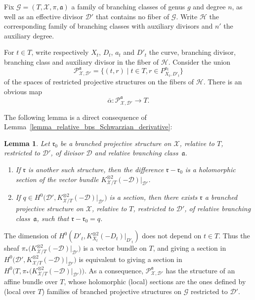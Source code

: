 \documentclass[10pt]{amsart}
\theoremstyle{definition}
\theoremstyle{plain}
\newtheorem{lemma}[definition]{Lemma}
\begin{document}
Fix $\mathcal G = (T, \mathcal X, \pi, \mathfrak a)$ a family of branching classes of genus $g$ and degree $n$, as well as an effective divisor $\mathcal D'$ that contains no fiber of $\mathcal G$.
Write $\mathcal H$ the corresponding family of branching classes with auxiliary divisors and $n'$ the auxiliary degree.

For $t \in T$, write respectively $X_t$, $D_t$, $a_t$ and $D'_t$ the curve, branching divisor, branching class and auxiliary divisor in the fiber of $\mathcal H$.
Consider the union\vspace*{-3pt}
\begin{equation*}
\mathcal P_{\mathcal X, \mathcal D'}^{\mathfrak a} = \bigl\{(t, r)\mid t \in T, r \in P_{X_t, D'_t}^{a_t}\bigr\}
\end{equation*}
of the spaces of restricted projective structures on the fibers of $\mathcal H$.
There is an obvious map\vspace*{-3pt}
\begin{equation*}
\overline \alpha: \mathcal P_{\mathcal X, \mathcal D'}^{\mathfrak a} \to T.
\end{equation*}

The following lemma is a direct consequence of Lemma~\ref{lemma_relative_bps_Schwarzian_derivative}:

\begin{lemma}
Let $\mathfrak r_0$ be a branched projective structure on $\mathcal X$, relative to $T$, restricted to $\mathcal D'$, of divisor $\mathcal D$ and relative branching class~$\mathfrak a$.
\begin{enumerate}
\item
If $\mathfrak r$ is another such structure, then the difference $\mathfrak r - \mathfrak r_0$ is a holomorphic section of the vector bundle $K_{\mathcal X/T}^{\otimes 2}(-\mathcal D)|_{\mathcal D'}$.
\item
If $q \in H^0\bigl(\mathcal D', K_{\mathcal X/T}^{\otimes 2}(-\mathcal D)|_{\mathcal D'}\bigr)$ is a section, then there exists $\mathfrak r$ a branched projective structure on $\mathcal X$, relative to $T$, restricted to $\mathcal D'$, of relative branching class~$\mathfrak a$, such that $\mathfrak r-\mathfrak r_0 = q$.
\end{enumerate}
\end{lemma}

The dimension of $H^0\left(D'_t, K_{X_t}^{\otimes 2}\left(-D_t\right)|_{D'_t}\right)$ does not depend on $t \in T$.
Thus the sheaf $\pi_*\bigl(K_{\mathcal X/T}^{\otimes 2}(-\mathcal D)|_{\mathcal D'}\bigr)$ is a vector bundle on $T$, and giving a section in $H^0\bigl(\mathcal D', K_{\mathcal X/T}^{\otimes 2}(-\mathcal D)|_{\mathcal D'}\bigr)$ is equivalent to giving a section in $
H^0\bigl(T, \pi_*\bigl(K_{\mathcal X/T}^{\otimes 2}(-\mathcal D)|_{\mathcal D'}\bigr) \bigr)$.
As a consequence, $\mathcal P_{\mathcal X, \mathcal D'}^{\mathfrak a}$ has the structure of an affine bundle over $T$, whose holomorphic (local) sections are the ones defined by (local over $T$) families of branched projective structures on $\mathcal G$ restricted to $\mathcal D'$.
\end{document}
